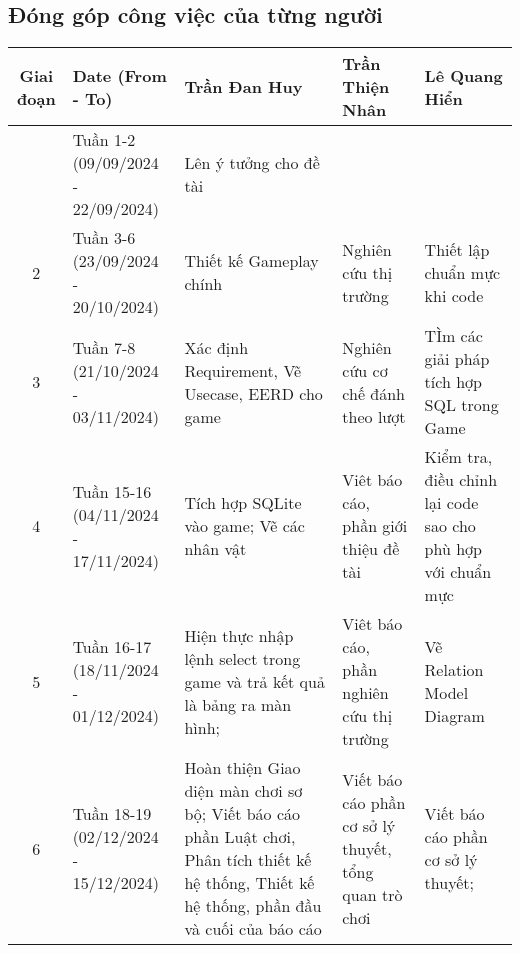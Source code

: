 \subsection{Đóng góp công việc của từng người}
\begin{longtable}{|c|p{2cm}|p{3cm}|p{3cm}|p{3cm}|}	
	\hline
	\textbf{Giai đoạn} & \textbf{Date (From - To)} & \textbf{Trần Đan Huy} & \textbf{Trần Thiện Nhân} & \textbf{Lê Quang Hiển}\\
	\hline
	\endhead
	
	\hline
	\endfoot
	
	\hline
	1 & Tuần 1-2 (09/09/2024 - 22/09/2024) & Lên ý tưởng cho đề tài & &\\
	2 &  Tuần 3-6 (23/09/2024 - 20/10/2024) & Thiết kế Gameplay chính & Nghiên cứu thị trường & Thiết lập chuẩn mực khi code \\
	3 &  Tuần 7-8 (21/10/2024 - 03/11/2024) & Xác định Requirement, Vẽ Usecase, EERD cho game & Nghiên cứu cơ chế đánh theo lượt & TÌm các giải pháp tích hợp SQL trong Game\\
	4 & Tuần 15-16 (04/11/2024 - 17/11/2024) & Tích hợp SQLite vào game;  Vẽ các nhân vật & Viêt báo cáo, phần giới thiệu đề tài & Kiểm tra, điều chỉnh lại code sao cho phù hợp với chuẩn mực \\
	5 & Tuần 16-17 (18/11/2024 - 01/12/2024) & Hiện thực nhập lệnh select trong game và trả kết quả là bảng ra màn hình; & Viêt báo cáo, phần nghiên cứu thị trường & Vẽ Relation Model Diagram \\
	6 & Tuần 18-19 (02/12/2024 - 15/12/2024) & Hoàn thiện Giao diện màn chơi sơ bộ; Viết báo cáo phần Luật chơi, Phân tích thiết kế hệ thống, Thiết kế hệ thống, phần đầu và cuối của báo cáo  & Viết báo cáo phần cơ sở lý thuyết, tổng quan trò chơi & Viết báo cáo phần cơ sở lý thuyết; \\
	\hline
	
\end{longtable}
\newpage
